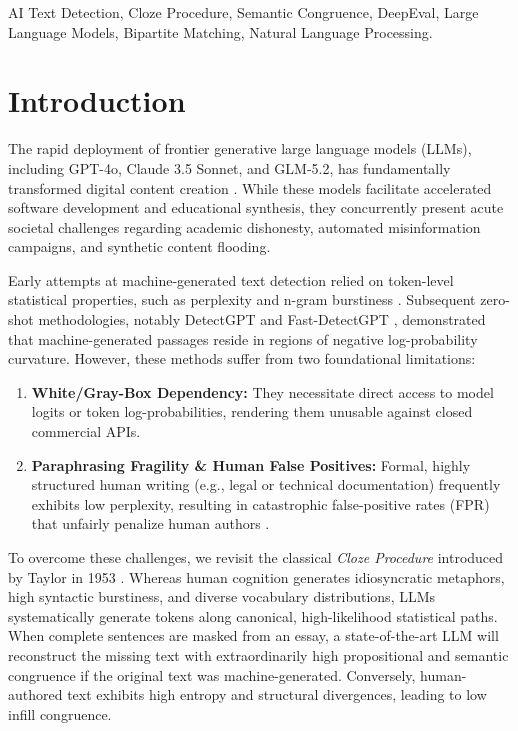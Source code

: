 \documentclass[conference]{IEEEtran}
\begin{document}
\begin{IEEEkeywords}
AI Text Detection, Cloze Procedure, Semantic Congruence, DeepEval, Large Language Models, Bipartite Matching, Natural Language Processing.
\end{IEEEkeywords}

\section{Introduction}
The rapid deployment of frontier generative large language models (LLMs), including GPT-4o, Claude 3.5 Sonnet, and GLM-5.2, has fundamentally transformed digital content creation \cite{zheng2023judging, touvron2023llama}. While these models facilitate accelerated software development and educational synthesis, they concurrently present acute societal challenges regarding academic dishonesty, automated misinformation campaigns, and synthetic content flooding.

Early attempts at machine-generated text detection relied on token-level statistical properties, such as perplexity and n-gram burstiness \cite{gehrmann2019gltr, sadasivan2023can}. Subsequent zero-shot methodologies, notably DetectGPT \cite{mitchell2023detectgpt} and Fast-DetectGPT \cite{bao2024fastdetectgpt}, demonstrated that machine-generated passages reside in regions of negative log-probability curvature. However, these methods suffer from two foundational limitations:
\begin{enumerate}
    \item \textbf{White/Gray-Box Dependency:} They necessitate direct access to model logits or token log-probabilities, rendering them unusable against closed commercial APIs.
    \item \textbf{Paraphrasing Fragility \& Human False Positives:} Formal, highly structured human writing (e.g., legal or technical documentation) frequently exhibits low perplexity, resulting in catastrophic false-positive rates (FPR) that unfairly penalize human authors \cite{chakraborty2023possibilities}.
\end{enumerate}

To overcome these challenges, we revisit the classical \textit{Cloze Procedure} introduced by Taylor in 1953 \cite{taylor1953cloze}. Whereas human cognition generates idiosyncratic metaphors, high syntactic burstiness, and diverse vocabulary distributions, LLMs systematically generate tokens along canonical, high-likelihood statistical paths. When complete sentences are masked from an essay, a state-of-the-art LLM will reconstruct the missing text with extraordinarily high propositional and semantic congruence if the original text was machine-generated. Conversely, human-authored text exhibits high entropy and structural divergences, leading to low infill congruence.
\end{document}
